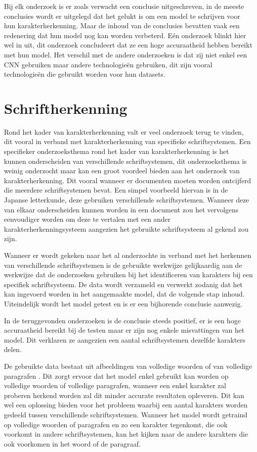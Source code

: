 Bij elk onderzoek is er zoals verwacht een conclusie uitgeschreven, in de meeste conclusies wordt er uitgelegd dat het gelukt is om een model te schrijven voor hun karakterherkenning.
Maar de inhoud van de conclusies bevatten vaak een redenering dat hun model nog kan worden verbeterd. \autocite{Ahmed2017}
Eén onderzoek blinkt hier wel in uit, dit onderzoek concludeert dat ze een hoge accuraatheid hebben bereikt met hun model. Het verschil met de andere onderzoeken is dat zij niet enkel een CNN gebruiken maar andere technologieën gebruiken, dit zijn vooral technologieën die gebruikt worden voor hun datasets. \autocite{Yann}

\section{Schriftherkenning}

Rond het kader van karakterherkenning valt er veel onderzoek terug te vinden, dit vooral in verband met karakterherkenning van specifieke schriftsystemen.
Een specifieker onderzoeksthema rond het kader van karakterherkenning is het kunnen onderscheiden van verschillende schriftsystemen, dit onderzoeksthema is weinig onderzocht maar kan een groot voordeel bieden aan het onderzoek van karakterherkenning.
Dit vooral wanneer er documenten moeten worden ontcijferd die meerdere schriftsystemen bevat. Een simpel voorbeeld hiervan is in de Japanse letterkunde, deze gebruiken verschillende schriftsystemen. Wanneer deze van elkaar onderscheiden kunnen worden in een document zou het vervolgens eenvoudiger worden om deze te vertalen met een ander karakterherkenningsysteem aangezien het gebruikte schriftsysteem al gekend zou zijn.

Wanneer er wordt gekeken naar het al onderzochte in verband met het herkennen van verschillende schriftsystemen is de gebruikte werkwijze gelijkaardig aan de werkwijze dat de onderzoeken gebruiken bij het identificeren van karakters bij een specifiek schriftsysteem.
De data wordt verzameld en verwerkt zodanig dat het kan ingevoerd worden in het aangemaakte model, dat de volgende stap inhoud.
Uiteindelijk wordt het model getest en is er een bijhorende conclusie aanwezig.

In de teruggevonden onderzoeken is de conclusie steeds positief, er is een hoge accuraatheid bereikt bij de testen maar er zijn nog enkele misvattingen van het model. Dit verklaren ze aangezien een aantal schriftsystemen dezelfde karakters delen. \autocite{Adman2015}

De gebruikte data bestaat uit afbeeldingen van volledige woorden \autocite{Baoguang2015} of van volledige paragrafen \autocite{Guo2009}.
Dit zorgt ervoor dat het model enkel gebruikt kan worden op volledige woorden of volledige paragrafen, wanneer een enkel karakter zal proberen herkend worden zal dit minder accurate resultaten opleveren.
Dit kan wel een oplossing bieden voor het probleem waarbij een aantal karakters worden gedeeld tussen verschillende schriftsystemen.
Wanneer het model wordt getraind op volledige woorden of paragrafen en zo een karakter tegenkomt, die ook voorkomt in andere schriftsystemen, kan het kijken naar de andere karakters die ook voorkomen in het woord of de paragraaf.

